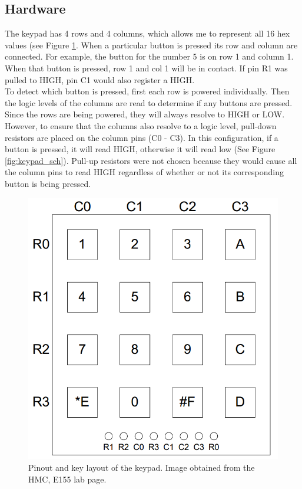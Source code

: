 \documentclass[11pt]{article}
\begin{document}
\subsection{Hardware}

The keypad has 4 rows and 4 columns, which allows me to represent all 16 hex values (see Figure \ref{fig:keypad_pinout}. When a particular button is pressed its row and column are connected. For example, the button for the number 5 is on row 1 and column 1. When that button is pressed, row 1 and col 1 will be in contact. If pin R1 was pulled to HIGH, pin C1 would also register a HIGH. \\

To detect which button is pressed, first each row is powered individually. Then the logic levels of the columns are read to determine if any buttons are pressed. Since the rows are being powered, they will always resolve to HIGH or LOW. However, to ensure that the columns also resolve to a logic level, pull-down resistors are placed on the column pins (C0 - C3). In this configuration, if a button is pressed, it will read HIGH, otherwise it will read low (See Figure \ref{fig:keypad_sch}). Pull-up resistors were not chosen because they would cause all the column pins to read HIGH regardless of whether or not its corresponding button is being pressed. \\


\begin{figure}[h!]
\centering
\includegraphics[scale=0.35]{keypad_pinout.png}
\caption{Pinout and key layout of the keypad. Image obtained from the HMC, E155 lab page.}
\label{fig:keypad_pinout}
\end{figure} 
\end{document}
